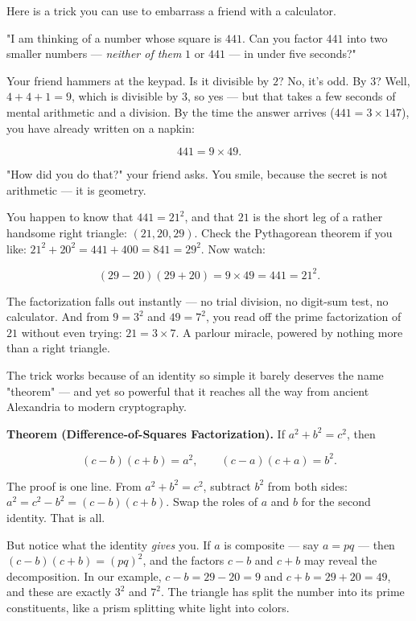 Here is a trick you can use to embarrass a friend with a calculator.

"I am thinking of a number whose square is $441$. Can you factor $441$ into two smaller numbers --- \textit{neither of them} $1$ or $441$ --- in under five seconds?"

Your friend hammers at the keypad. Is it divisible by $2$? No, it's odd. By $3$? Well, $4 + 4 + 1 = 9$, which is divisible by $3$, so yes --- but that takes a few seconds of mental arithmetic and a division. By the time the answer arrives ($441 = 3 \times 147$), you have already written on a napkin:

\[441 = 9 \times 49.\]

"How did you do that?" your friend asks. You smile, because the secret is not arithmetic --- it is geometry.

You happen to know that $441 = 21^2$, and that $21$ is the short leg of a rather handsome right triangle: $(21, 20, 29)$. Check the Pythagorean theorem if you like: $21^2 + 20^2 = 441 + 400 = 841 = 29^2$. Now watch:

\[(29 - 20)(29 + 20) = 9 \times 49 = 441 = 21^2.\]

The factorization falls out instantly --- no trial division, no digit-sum test, no calculator. And from $9 = 3^2$ and $49 = 7^2$, you read off the prime factorization of $21$ without even trying: $21 = 3 \times 7$. A parlour miracle, powered by nothing more than a right triangle.


The trick works because of an identity so simple it barely deserves the name "theorem" --- and yet so powerful that it reaches all the way from ancient Alexandria to modern cryptography.

\textbf{Theorem (Difference-of-Squares Factorization).} If $a^2 + b^2 = c^2$, then

\[(c - b)(c + b) = a^2, \qquad (c - a)(c + a) = b^2.\]

The proof is one line. From $a^2 + b^2 = c^2$, subtract $b^2$ from both sides: $a^2 = c^2 - b^2 = (c-b)(c+b)$. Swap the roles of $a$ and $b$ for the second identity. That is all.

But notice what the identity \textit{gives} you. If $a$ is composite --- say $a = pq$ --- then $(c-b)(c+b) = (pq)^2$, and the factors $c - b$ and $c + b$ may reveal the decomposition. In our example, $c - b = 29 - 20 = 9$ and $c + b = 29 + 20 = 49$, and these are exactly $3^2$ and $7^2$. The triangle has split the number into its prime constituents, like a prism splitting white light into colors.

